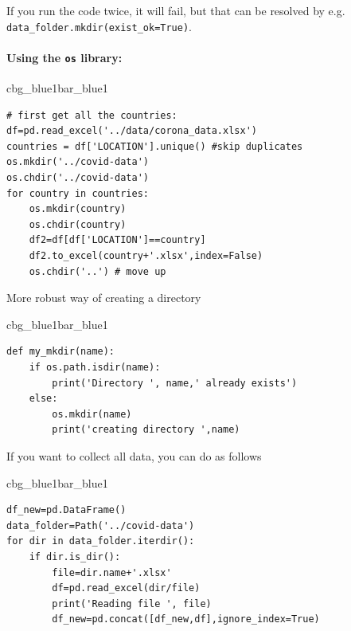 \documentclass[%
oneside,                 %
final,                   %
10pt]{article}
\newenvironment{_pro_tight}[2]{
   \def\FrameCommand{\color{#2}\vrule width 1mm\normalcolor\colorbox{#1}}
   \FrameRule0.6pt\MakeFramed {\advance\hsize-2mm\FrameRestore}\vskip3mm}
   {\vskip0mm\endMakeFramed}
\newenvironment{pro}[2]{
\bgroup\rmfamily
\fboxsep=0mm\relax
\begin{_pro_tight}{#1}{#2}
\list{}{\parsep=-2mm\parskip=0mm\topsep=0pt\leftmargin=2mm
\rightmargin=2\leftmargin\leftmargin=4pt\relax}
\item\relax}
{\endlist\end{_pro_tight}\egroup}
\begin{document}
If you run the code twice, it will fail, but that can be resolved by e.g. \Verb!data_folder.mkdir(exist_ok=True)!.  

\paragraph{Using the \texttt{os} library:}













\begin{pro}{cbg_blue1}{bar_blue1}\begin{Verbatim}[numbers=none,fontsize=\fontsize{9pt}{9pt},baselinestretch=0.95,xleftmargin=2mm]
# first get all the countries:
df=pd.read_excel('../data/corona_data.xlsx')
countries = df['LOCATION'].unique() #skip duplicates
os.mkdir('../covid-data')
os.chdir('../covid-data')
for country in countries:
    os.mkdir(country)
    os.chdir(country)
    df2=df[df['LOCATION']==country]
    df2.to_excel(country+'.xlsx',index=False)
    os.chdir('..') # move up

\end{Verbatim}
\end{pro}
\noindent


More robust way of creating a directory







\begin{pro}{cbg_blue1}{bar_blue1}\begin{Verbatim}[numbers=none,fontsize=\fontsize{9pt}{9pt},baselinestretch=0.95,xleftmargin=2mm]
def my_mkdir(name):
    if os.path.isdir(name):
        print('Directory ', name,' already exists')
    else:
        os.mkdir(name)
        print('creating directory ',name)

\end{Verbatim}
\end{pro}
\noindent


If you want to collect all data, you can do as follows









\begin{pro}{cbg_blue1}{bar_blue1}\begin{Verbatim}[numbers=none,fontsize=\fontsize{9pt}{9pt},baselinestretch=0.95,xleftmargin=2mm]
df_new=pd.DataFrame()
data_folder=Path('../covid-data')
for dir in data_folder.iterdir():
    if dir.is_dir():      
        file=dir.name+'.xlsx'
        df=pd.read_excel(dir/file)
        print('Reading file ', file)
        df_new=pd.concat([df_new,df],ignore_index=True)

\end{Verbatim}
\end{pro}
\noindent
\end{document}
